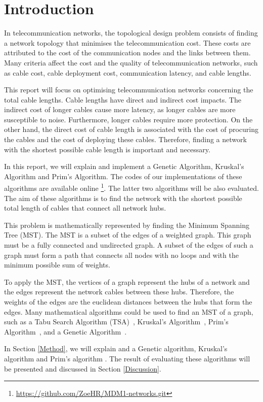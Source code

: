 \documentclass[twocolumn]{article}
\begin{document}
\section{Introduction}
In telecommunication networks, the topological design problem consists of finding a network topology that minimises the telecommunication cost. 
These costs are attributed to the cost of the communication nodes and the links between them. Many criteria affect the cost and the quality of telecommunication networks, such as cable cost, cable deployment cost, communication latency,  and cable lengths.\par This report will focus on optimising telecommunication networks concerning the total cable lengths. Cable lengths have direct and indirect cost impacts. The indirect cost of longer cables cause more latency, as longer cables are more susceptible to noise. Furthermore, longer cables require more protection.
On the other hand, the direct cost of cable length is associated with the cost of procuring the cables and the cost of deploying these cables. Therefore, finding a network with the shortest possible cable length is important and necessary.\par In this report, we will explain and implement a Genetic Algorithm, Kruskal’s Algorithm and Prim’s Algorithm. The codes of our implementations of these algorithms are available online \footnote{\url{https://github.com/ZoeHR/MDM1-networks.git}}. The latter two algorithms will be also evaluated. The aim of these algorithms is to find the network with the shortest possible total length of cables that connect all network hubs.
\par This problem is mathematically represented by finding the Minimum Spanning Tree (MST). The MST is a subset of the edges of a weighted graph. This graph must be a fully connected and undirected graph. A subset of the edges of such a graph must form a path that connects all nodes with no loops and with the minimum possible sum of weights.
\par To apply the MST, the vertices of a graph represent the hubs of a network and the edges represent the network cables between these hubs. Therefore, the weights of the edges are the euclidean distances between the hubs that form the edges. Many mathematical algorithms could be used to find an MST of a graph, such as a Tabu Search Algorithm (TSA)~\cite{jiang1999tabu, pierre1997improving}, Kruskal’s Algorithm~\cite{rafid2019performance}, Prim’s Algorithm~\cite{dey2016prim}, and a Genetic Algorithm~\cite{almeida2005genetic}. \par
In Section \ref{Method}, we will explain and a Genetic algorithm,  Kruskal’s algorithm and Prim’s algorithm . The result of evaluating these algorithms will be presented and discussed in Section \ref{Discussion}.
\end{document}

